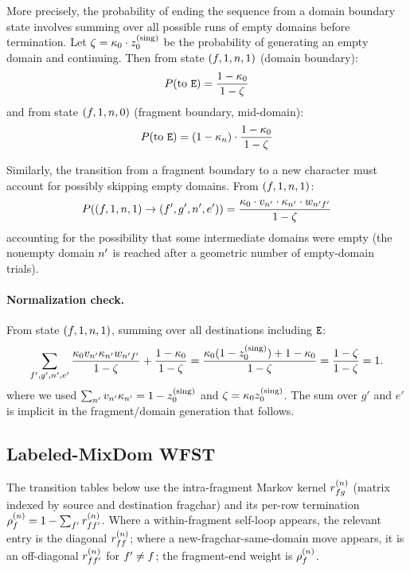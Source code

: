 More precisely, the probability of ending the sequence from a domain boundary state
involves summing over all possible runs of empty domains before termination.
Let $\zeta = \kappa_0 \cdot z_0^{(\rm sing)}$ be the probability of generating
an empty domain and continuing.
Then from state $(f, 1, n, 1)$ (domain boundary):
\begin{equation}
\label{eq:singlet-end-domain}
P(\text{to } {\tt E}) = \frac{1 - \kappa_0}{1 - \zeta}
\end{equation}
and from state $(f, 1, n, 0)$ (fragment boundary, mid-domain):
\begin{equation}
\label{eq:singlet-end-frag}
P(\text{to } {\tt E}) = (1 - \kappa_n) \cdot \frac{1 - \kappa_0}{1 - \zeta}
\end{equation}

Similarly, the transition from a fragment boundary to a new character must account for
possibly skipping empty domains. From $(f, 1, n, 1)$:
\begin{equation}
\label{eq:singlet-newdom}
P((f, 1, n, 1) \to (f', g', n', e'))
= \frac{\kappa_0 \cdot v_{n'} \cdot \kappa_{n'} \cdot w_{n'f'}}{1 - \zeta}
\end{equation}
accounting for the possibility that some intermediate domains were empty
(the nonempty domain $n'$ is reached after a geometric number of empty-domain trials).

\paragraph{Normalization check.}
From state $(f, 1, n, 1)$, summing over all destinations including ${\tt E}$:
\[
\sum_{f',g',n',e'} \frac{\kappa_0 v_{n'} \kappa_{n'} w_{n'f'}}{1-\zeta}
+ \frac{1-\kappa_0}{1-\zeta}
= \frac{\kappa_0(1 - z_0^{(\rm sing)}) + 1 - \kappa_0}{1 - \zeta}
= \frac{1 - \zeta}{1 - \zeta} = 1.
\]
where we used $\sum_{n'} v_{n'} \kappa_{n'} = 1 - z_0^{(\rm sing)}$
and $\zeta = \kappa_0 z_0^{(\rm sing)}$.
The sum over $g'$ and $e'$ is implicit in the fragment/domain generation that follows.


\subsection{Labeled-MixDom WFST}
\label{sec:labeled-wfst}

\begin{remark}
\label{rem:wfst-notation}
The transition tables below use the intra-fragment Markov kernel
$r^{(n)}_{fg}$ (matrix indexed by source and
destination fragchar) and its per-row termination
$\rho^{(n)}_f = 1 - \sum_{f'} r^{(n)}_{ff'}$.
Where a within-fragment self-loop appears, the relevant entry is the
diagonal $r^{(n)}_{ff}$; where a new-fragchar-same-domain
move appears, it is an off-diagonal $r^{(n)}_{ff'}$ for
$f' \neq f$; the fragment-end weight is $\rho^{(n)}_f$.
\end{remark}

